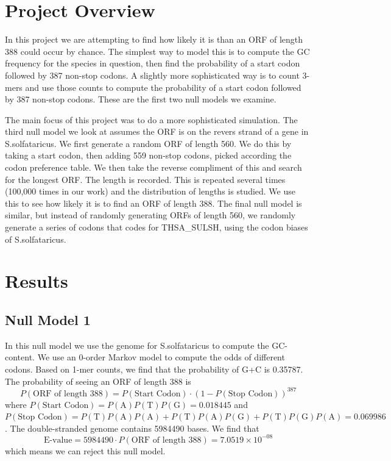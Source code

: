 \documentclass[11pt]{article}
\begin{document}
\pagestyle{fancy}

\section{Project Overview} 

In this project we are attempting to find how likely it is than an ORF of length 388 could occur by chance.  The simplest way to model this is to compute the GC frequency for the species in question, then find the probability of a start codon followed by 387 non-stop codons.  A slightly more sophisticated way is to count 3-mers and use those counts to compute the probability of a start codon followed by 387 non-stop codons.  These are the first two null models we examine.

The main focus of this project was to do a more sophisticated simulation.  The third null model we look at assumes the ORF is on the revers strand of a gene in S.solfataricus.  We first generate a random ORF of length 560.  We do this by taking a start codon, then adding 559 non-stop codons, picked according the codon preference table.  We then take the reverse compliment of this and search for the longest ORF.  The length is recorded.  This is repeated several times (100,000 times in our work) and the distribution of lengths is studied.  We use this to see how likely it is to find an ORF of length 388.  The final null model is similar, but instead of randomly generating ORFs of length 560, we randomly generate a series of codons that codes for THSA\_SULSH, using the codon biases of S.solfataricus.

\section{Results}

\subsection{Null Model 1}

In this null model we use the genome for S.solfataricus to compute the GC-content.  We use an 0-order Markov model to compute the odds of different codons.  Based on 1-mer counts, we find that the probability of G+C is 0.35787.  The probability of seeing an ORF of length 388 is 
\[P(\text{ORF of length 388}) = P(\text{Start Codon}) \cdot (1-P(\text{Stop Codon}))^{387} \]
where $P(\text{Start Codon}) = P(\text{A})P(\text{T})P(\text{G}) = 0.018445$ and $P(\text{Stop Codon}) = P(\text{T})P(\text{A})P(\text{A}) + P(\text{T})P(\text{A})P(\text{G}) + P(\text{T})P(\text{G})P(\text{A}) = 0.069986$. The double-stranded genome contains 5984490 bases.  We find that
\[\text{E-value} = 5984490 \cdot P(\text{ORF of length 388}) = 7.0519 \times 10^{-08}\]
which means we can reject this null model.
\end{document}

